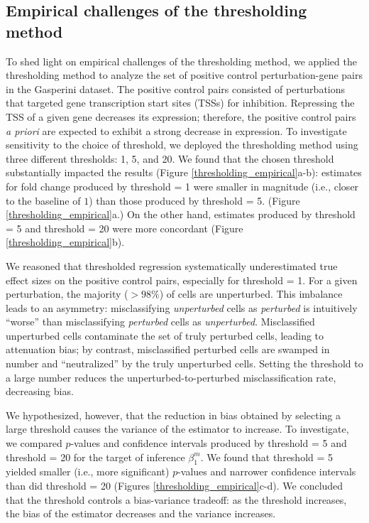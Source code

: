 \documentclass[12pt]{article}
\begin{document}
\subsection{Empirical challenges of the thresholding method}\label{sec:thresholding_empirical}
To shed light on empirical challenges of the thresholding method, we applied the thresholding method to analyze the set of positive control perturbation-gene pairs in the Gasperini dataset. The positive control pairs consisted of perturbations that targeted gene transcription start sites (TSSs) for inhibition. Repressing the TSS of a given gene decreases its expression; therefore, the positive control pairs \textit{a priori} are expected to exhibit a strong decrease in expression. To investigate sensitivity to the choice of threshold, we deployed the thresholding method using three different thresholds: 1, 5, and 20. We found that the chosen threshold substantially impacted the results (Figure \ref{thresholding_empirical}a-b): estimates for fold change produced by threshold = 1 were smaller in magnitude (i.e., closer to the baseline of $1$) than those produced by threshold = 5. (Figure \ref{thresholding_empirical}a.) On the other hand, estimates produced by threshold = 5 and threshold = 20 were more concordant (Figure \ref{thresholding_empirical}b). 

We reasoned that thresholded regression systematically underestimated true effect sizes on the positive control pairs, especially for threshold = 1. For a given perturbation, the majority ($>98\%$) of cells are unperturbed. This imbalance leads to an asymmetry: misclassifying \textit{unperturbed} cells as \textit{perturbed} is intuitively ``worse'' than misclassifying \textit{perturbed} cells as \textit{unperturbed}. Misclassified unperturbed cells contaminate the set of truly perturbed cells, leading to attenuation bias; by contrast, misclassified perturbed cells are swamped in number and ``neutralized'' by the truly unperturbed cells. Setting the threshold to a large number reduces the unperturbed-to-perturbed misclassification rate, decreasing bias.

We hypothesized, however, that the reduction in bias obtained by selecting a large threshold causes the variance of the estimator to increase. To investigate, we compared $p$-values and confidence intervals produced by threshold = 5 and threshold = 20 for the target of inference $\beta^m_1$. We found that threshold = 5 yielded smaller (i.e., more significant) $p$-values and narrower confidence intervals than did threshold = 20 (Figures \ref{thresholding_empirical}c-d). We concluded that the threshold controls a bias-variance tradeoff: as the threshold increases, the bias of the estimator decreases and the variance increases.
\end{document}
